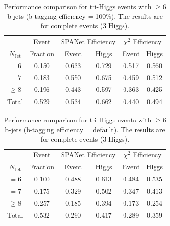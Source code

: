 \documentclass[12pt]{article}
\begin{document}
		\begin{table}[htpb]
			\centering
			\caption{Performance comparison for tri-Higgs events with $\ge 6$ b-jets (b-tagging efficiency = 100\%). The results are for complete events (3 Higgs).}
			\label{tab:comparison_triHiggs_SPANet_and_chi2_diHiggs_with_btag_100}
			\begin{tabular}{c|c|cc|cc}
					  & Event    & \multicolumn{2}{|c|}{SPANet Efficiency} & \multicolumn{2}{|c}{ $\chi^2$ Efficiency} \\
				$N_\text{Jet}$ & Fraction & Event             & Higgs             & Event            & Higgs           \\
				\hline
				$=6$	  &   0.150       &     0.633       &   0.729       &   0.517           &    0.560          \\
				$=7$	  &   0.183       &     0.550       &   0.675       &   0.459           &    0.512          \\
				$\ge 8$	  &   0.196       &     0.443       &   0.597		&   0.363           &    0.425          \\
				Total	  &   0.529       &     0.534       &   0.662       &   0.440           &    0.494            
			\end{tabular}
		\end{table}

		\begin{table}[htpb]
			\centering
			\caption{Performance comparison for tri-Higgs events with $\ge 6$ b-jets (b-tagging efficiency = default).  The results are for complete events (3 Higgs).}
			\label{tab:comparison_triHiggs_SPANet_and_chi2_diHiggs_with_btag_default}
			\begin{tabular}{c|c|cc|cc}
					  & Event    & \multicolumn{2}{|c|}{SPANet Efficiency} & \multicolumn{2}{|c}{ $\chi^2$ Efficiency} \\
				$N_\text{Jet}$ & Fraction & Event             & Higgs             & Event            & Higgs           \\
				\hline
				$=6$	  &   0.100       &     0.488       &   0.613       &   0.484           &    0.535          \\
				$=7$	  &   0.175       &     0.329       &   0.502       &   0.347           &    0.413          \\
				$\ge 8$	  &   0.257       &     0.185       &   0.394		&   0.173           &    0.254          \\
				Total	  &   0.532       &     0.290       &   0.417       &   0.289           &    0.359            
			\end{tabular}
		\end{table}
\end{document}
